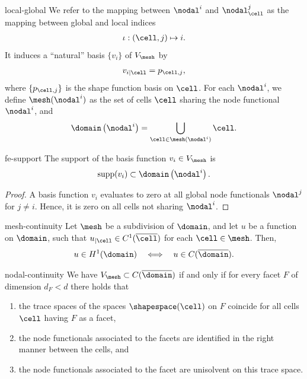 \begin{Definition}{local-global}
  We refer to the mapping between $\nodal^i$ and $\nodal_\cell^j$ as
  the mapping between global and local indices
  \begin{gather}
    \iota: (\cell, j) \mapsto i.
  \end{gather}
  It induces a
  ``natural'' basis $\{v_i\}$ of $V_\mesh$ by
  \begin{gather}
    v_{i|\cell} = p_{\cell,j},
  \end{gather}
  where $\{p_{\cell,j}\}$ is the shape function basis on $\cell$. For
  each $\nodal^i$, we define $\mesh(\nodal^i)$ as the set of cells
  $\cell$ sharing the node functional $\nodal^i$, and
  \begin{gather}
    \domain\left(\nodal^i\right) = \bigcup_{\cell\in \mesh(\nodal^i)} \cell.
  \end{gather}
\end{Definition}

\begin{Lemma}{fe-support}
  The support of the basis function $v_i\in V_\mesh$ is
  \begin{gather*}
    \operatorname{supp}(v_i) \subset \domain\left(\nodal^i\right).
  \end{gather*}
\end{Lemma}

\begin{proof}
  A basis function $v_i$ evaluates to zero at all global node
  functionals $\nodal^j$ for $j\neq i$. Hence, it is zero on all cells
  not sharing $\nodal^i$.
\end{proof}

\begin{Lemma}{mesh-continuity}
  Let $\mesh$ be a subdivision of $\domain$, and let $u$ be a function
  on $\domain$, such that $u_{|\cell} \in C^1(\overline{\cell})$ for
  each $\cell\in\mesh$. Then,
  \begin{gather}
    u\in H^1(\domain)
    \quad \Longleftrightarrow\quad
    u\in C(\overline\domain).
  \end{gather}
\end{Lemma}

\begin{Lemma}{nodal-continuity}
  We have $V_\mesh\subset C(\overline{\domain})$ if and only if for
  every facet $F$ of dimension $d_F < d$ there holds that
  \begin{enumerate}
  \item the trace spaces of the spaces $\shapespace(\cell)$ on $F$ coincide
    for all cells $\cell$ having $F$ as a facet,
  \item the node functionals associated to the facets are identified
    in the right manner between the cells, and
  \item the node functionals associated to the facet are unisolvent on
    this trace space.
  \end{enumerate}
\end{Lemma}

